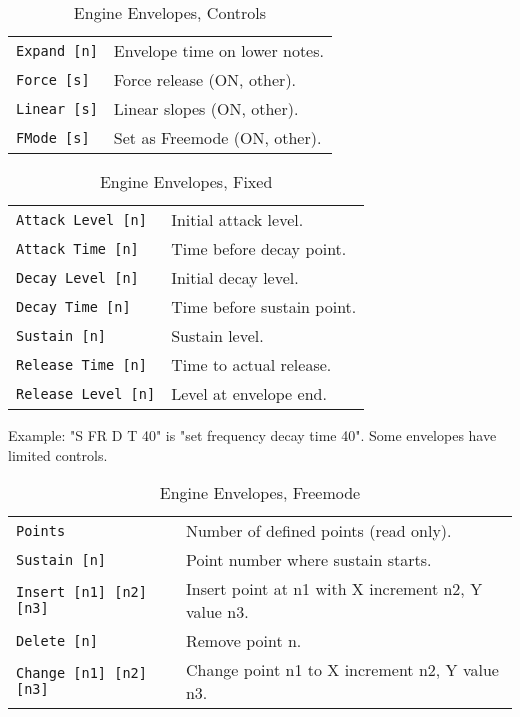    \begin{table}[H]
      \centering
      \caption{Engine Envelopes, Controls}
      \label{table:yoshimi_engine_envelopes_controls}
      \begin{tabular}{l l}

\texttt{Expand [n]} &
   Envelope time on lower notes. \\
\texttt{Force [s]} &
   Force release (ON, other). \\
\texttt{Linear [s]} &
   Linear slopes (ON, other). \\
\texttt{FMode [s]} &
   Set as Freemode (ON, other). \\

      \end{tabular}
   \end{table}

   \begin{table}[H]
      \centering
      \caption{Engine Envelopes, Fixed}
      \label{table:yoshimi_engine_envelopes_fixed}
      \begin{tabular}{l l}

\texttt{Attack Level [n]} &
   Initial attack level. \\
\texttt{Attack Time [n]} &
   Time before decay point. \\
\texttt{Decay Level [n]} &
   Initial decay level. \\
\texttt{Decay Time [n]} &
   Time before sustain point. \\
\texttt{Sustain [n]} &
   Sustain level. \\
\texttt{Release Time [n]} &
   Time to actual release. \\
\texttt{Release Level [n]} &
   Level at envelope end. \\

      \end{tabular}
   \end{table}

Example: "S FR D T 40" is "set frequency decay time 40".
Some envelopes have limited controls.

   \begin{table}[H]
      \centering
      \caption{Engine Envelopes, Freemode}
      \label{table:yoshimi_engine_envelopes_freemode}
      \begin{tabular}{l l}

\texttt{Points} &
   Number of defined points (read only). \\
\texttt{Sustain [n]} &
   Point number where sustain starts. \\
\texttt{Insert [n1] [n2] [n3]} &
   Insert point at n1 with X increment n2, Y value n3. \\
\texttt{Delete [n]} &
   Remove point n. \\
\texttt{Change [n1] [n2] [n3]} &
   Change point n1 to X increment n2, Y value n3. \\

      \end{tabular}
   \end{table}

